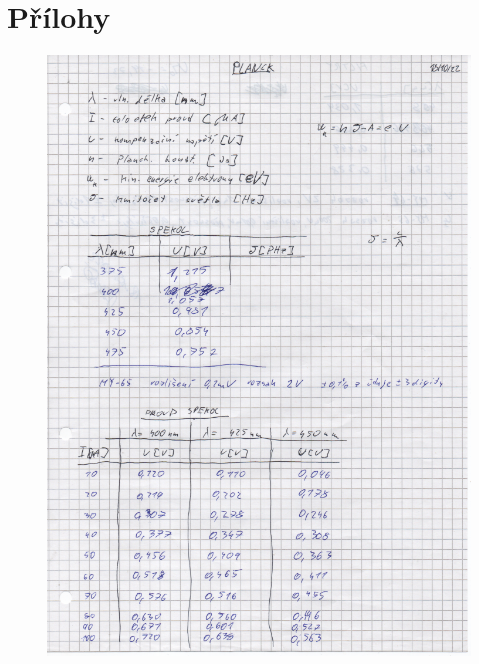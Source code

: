 \documentclass[titlepage]{article}
\begin{document}
\section{Přílohy}
\begin{figure}[H]
 \centering
 \begin{minipage}{0.4\textwidth}
  \includegraphics[width=\textwidth]{page1.png}
 \end{minipage}
 \hfil
 \begin{minipage}{0.4\textwidth}

\end{minipage}
\end{figure}
\end{document}
